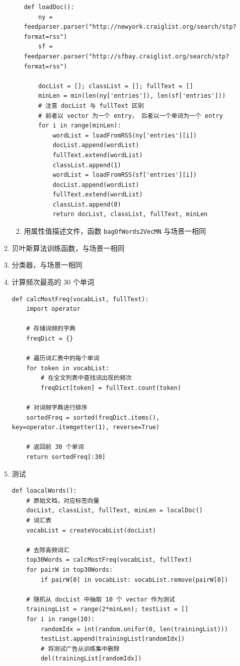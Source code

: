 \documentclass[11pt]{ctexart}
\begin{document}
\begin{enumerate}
\begin{enumerate}
\begin{enumerate}
\begin{lstlisting}
def loadDoc():
    ny = feedparser.parser("http://newyork.craiglist.org/search/stp?format=rss")
    sf = feedparser.parser("http://sfbay.craiglist.org/search/stp?format=rss")

    docList = []; classList = []; fullText = []
    minLen = min(len(ny['entries']), len(sf['entries']))
    # 注意 docList 与 fullText 区别
    # 前者以 vector 为一个 entry， 后者以一个单词为一个 entry
    for i in range(minLen):
        wordList = loadFromRSS(ny['entries'][i])
        docList.append(wordList)
        fullText.extend(wordList)
        classList.append(1)
        wordList = loadFromRSS(sf['entries'][i])
        docList.append(wordList)
        fullText.extend(wordList)
        classList.append(0)
        return docList, classList, fullText, minLen
\end{lstlisting}

\item 用属性值描述文件，函数 \texttt{bagOfWords2VecMN} 与场景一相同
\end{enumerate}
\item 贝叶斯算法训练函数，与场景一相同
\item 分类器，与场景一相同
\item 计算频次最高的 30 个单词
\lstset{language=Python,label= ,caption= ,captionpos=b,numbers=none}
\begin{lstlisting}
def calcMostFreq(vocabList, fullText):
    import operator

    # 存储词频的字典
    freqDict = {}

    # 遍历词汇表中的每个单词
    for token in vocabList:
        # 在全文列表中查找词出现的频次
        freqDict[token] = fullText.count(token)

    # 对词频字典进行排序
    sortedFreq = sorted(freqDict.items(), key=operator.itemgetter(1), reverse=True)

    # 返回前 30 个单词
    return sortedFreq[:30]
\end{lstlisting}
\item 测试
\lstset{language=Python,label= ,caption= ,captionpos=b,numbers=none}
\begin{lstlisting}
def loacalWords():
    # 原始文档，对应标签向量
    docList, classList, fullText, minLen = localDoc()
    # 词汇表
    vocabList = createVocabList(docList)

    # 去除高频词汇
    top30Words = calcMostFreq(vocabList, fullText)
    for pairW in top30Words:
        if pairW[0] in vocabList: vocabList.remove(pairW[0])

    # 随机从 docList 中抽取 10 个 vector 作为测试
    trainingList = range(2*minLen); testList = []
    for i in range(10):
        randomIdx = int(random.unifor(0, len(trainingList)))
        testList.append(trainingList[randomIdx])
        # 将测试广告从训练集中删除
        del(trainingList[randomIdx])


\end{lstlisting}
\end{enumerate}
\end{enumerate}
\end{document}
